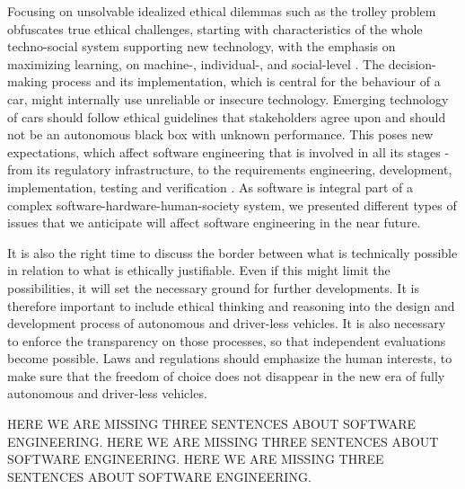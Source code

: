Focusing on unsolvable idealized ethical dilemmas such as the trolley problem obfuscates true ethical challenges, starting with characteristics of the whole techno-social system supporting new technology, with the emphasis on maximizing learning, on machine-, individual-, and social-level \cite{DodigCrnkovic2012, DBLP:journals/corr/CharisiDFLMSSWY17}. The decision-making process and its implementation, which is central for the behaviour of a car, might internally use unreliable or insecure technology. Emerging technology of  cars should follow ethical guidelines that stakeholders agree upon and should not be an autonomous black box with unknown performance. This poses new expectations, which affect software engineering that is involved in all its stages - from its regulatory infrastructure, to the requirements engineering, development, implementation, testing and verification \cite{Greene2016_1514,MoralMachine2016,Mooney2016,Ackerman2016,DBLP:journals/corr/CharisiDFLMSSWY17}. As software is integral part of a complex software-hardware-human-society system, we presented different types of issues that we anticipate will affect software engineering in the near future.

It is also the right time to discuss the border between what is technically possible in relation to what is ethically justifiable. Even if this might limit the possibilities, it will set the necessary ground for further developments. It is therefore important to include ethical thinking and reasoning into the design and development process of autonomous and driver-less vehicles. It is also necessary to enforce the transparency on those processes, so that independent evaluations become possible. Laws and regulations should emphasize the human interests, to make sure that the freedom of choice does not disappear in the new era of fully autonomous and driver-less vehicles. 

 HERE WE ARE MISSING THREE SENTENCES ABOUT SOFTWARE ENGINEERING. 
 HERE WE ARE MISSING THREE SENTENCES ABOUT SOFTWARE ENGINEERING. 
HERE WE ARE MISSING THREE SENTENCES ABOUT SOFTWARE ENGINEERING. 

